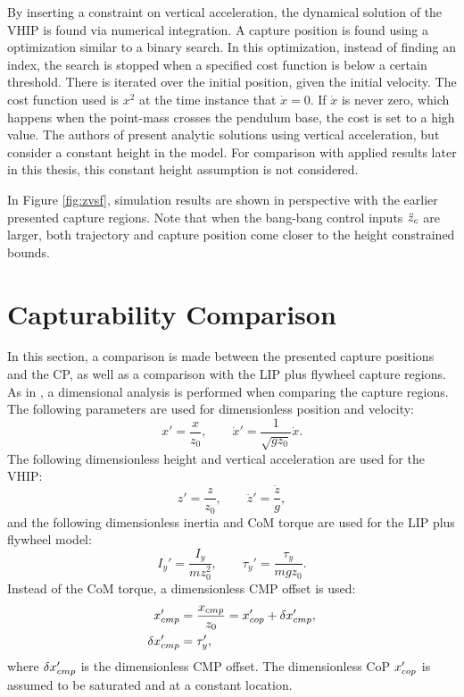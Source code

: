 By inserting a constraint on vertical acceleration, the dynamical solution of the \ac{VHIP} is found via numerical integration. A capture position is found using a optimization similar to a binary search. In this optimization, instead of finding an index, the search is stopped when a specified cost function is below a certain threshold. There is iterated over the initial position, given the initial velocity. The cost function used is $x^2$ at the time instance that $\dot{x}=0$.  If $\dot{x}$ is never zero, which happens when the point-mass crosses the pendulum base, the cost is set to a high value. The authors of \cite{gao2017increase} present analytic solutions using vertical acceleration, but consider a constant height in the model. For comparison with applied results later in this thesis, this constant height assumption is not considered. 

In Figure \ref{fig:zvsf}, simulation results are shown in perspective with the earlier presented capture regions. Note that when the bang-bang control inputs $\ddot{z}_{c}$ are larger, both trajectory and capture position come closer to the height constrained bounds.

\section{Capturability Comparison}
In this section, a comparison is made between the presented capture positions and the \ac{CP}, as well as a comparison with the \ac{LIP} plus flywheel capture regions. As in \cite{pratt2006capture, stephens2007humanoid, koolen2012capturability}, a dimensional analysis \cite{mcmahon1983size} is performed when comparing the capture regions. The following parameters are used for dimensionless position and velocity:
\begin{equation}
	x' = \frac{x}{z_0}, \qquad \dot{x}' = \frac{1}{\sqrt{gz_0}}\dot{x}.
\end{equation}
The following dimensionless height and vertical acceleration are used for the \ac{VHIP}:
\begin{equation}
 z' = \frac{z}{z_0}, \qquad \ddot{z}'=\frac{\ddot{z}}{g},
\end{equation}
and the following dimensionless inertia and \ac{CoM} torque are used for the \ac{LIP} plus flywheel model:
\begin{equation}
I_y'=\frac{I_y}{mz_0^2}, \qquad \tau_y' = \frac{\tau_y}{mgz_0}.
\end{equation}
Instead of the \ac{CoM} torque, a dimensionless \ac{CMP} offset is used:
\begin{align}
	x_{cmp}' &=\frac{x_{cmp}}{z_0}=x_{cop}' + \delta x_{cmp}',\\
	\delta x_{cmp}' &=\tau_y',
\end{align}
where $\delta x_{cmp}'$ is the dimensionless \ac{CMP} offset. The dimensionless \ac{CoP} $x_{cop}'$ is assumed to be saturated and at a constant location.

